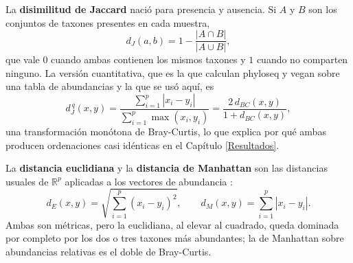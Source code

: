 La \textbf{disimilitud de Jaccard} \citep{jaccard1912distribution} nació para presencia y ausencia.
Si $A$ y $B$ son los conjuntos de taxones presentes en cada muestra,
\begin{equation}
d_{J}(a, b) = 1 - \frac{|A \cap B|}{|A \cup B|},
\label{eq:jaccard}
\end{equation}
que vale $0$ cuando ambas contienen los mismos taxones y $1$ cuando no comparten ninguno. La versión
cuantitativa, que es la que calculan phyloseq y vegan sobre una tabla de abundancias y la que se usó
aquí, es
\begin{equation}
d_{J}^{\,q}(x, y) = \frac{\sum_{i=1}^{p} |x_i - y_i|}{\sum_{i=1}^{p} \max(x_i, y_i)} = \frac{2\, d_{BC}(x,y)}{1 + d_{BC}(x,y)},
\label{eq:jaccard-cuant}
\end{equation}
una transformación monótona de Bray-Curtis, lo que explica por qué ambas producen ordenaciones casi
idénticas en el Capítulo \ref{Resultados}.

La \textbf{distancia euclidiana} y la \textbf{distancia de Manhattan} son las distancias usuales de
$\mathbb{R}^p$ aplicadas a los vectores de abundancia \citep{legendre2012numerical}:
\begin{equation}
d_{E}(x, y) = \sqrt{\sum_{i=1}^{p} (x_i - y_i)^2}, \qquad
d_{M}(x, y) = \sum_{i=1}^{p} |x_i - y_i|.
\label{eq:euclidiana-manhattan}
\end{equation}
Ambas son métricas, pero la euclidiana, al elevar al cuadrado, queda dominada por completo por los
dos o tres taxones más abundantes; la de Manhattan sobre abundancias relativas es el doble de
Bray-Curtis.

